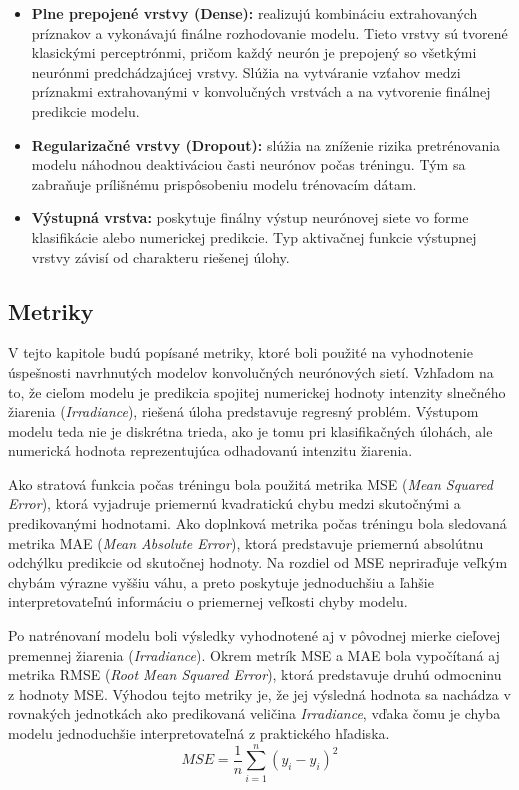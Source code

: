 \begin{itemize}
    \item \textbf{Plne prepojené vrstvy (Dense):} realizujú kombináciu extrahovaných príznakov a vykonávajú 
    finálne rozhodovanie modelu. Tieto vrstvy sú tvorené klasickými perceptrónmi, pričom každý 
    neurón je prepojený so všetkými neurónmi predchádzajúcej vrstvy. Slúžia na vytváranie vzťahov medzi 
    príznakmi extrahovanými v konvolučných vrstvách a na vytvorenie finálnej predikcie modelu.

    \item \textbf{Regularizačné vrstvy (Dropout):} slúžia na zníženie rizika pretrénovania modelu náhodnou deaktiváciou časti neurónov počas tréningu. Tým sa zabraňuje prílišnému prispôsobeniu modelu trénovacím dátam.

    \item \textbf{Výstupná vrstva:} poskytuje finálny výstup neurónovej siete vo forme klasifikácie alebo numerickej predikcie. Typ aktivačnej funkcie výstupnej vrstvy závisí od charakteru riešenej úlohy.
\end{itemize}





\vspace{\baselineskip}
\subsection{Metriky}
V tejto kapitole budú popísané metriky, ktoré boli použité na vyhodnotenie úspešnosti navrhnutých 
modelov konvolučných neurónových sietí. Vzhľadom na to, že cieľom modelu je predikcia spojitej numerickej hodnoty intenzity 
slnečného žiarenia (\textit{Irradiance}), riešená úloha predstavuje regresný problém. 
Výstupom modelu teda nie je diskrétna trieda, ako je tomu pri klasifikačných úlohách, ale numerická hodnota reprezentujúca 
odhadovanú intenzitu žiarenia.

Ako stratová funkcia počas tréningu bola 
použitá metrika MSE (\textit{Mean Squared Error}), ktorá vyjadruje priemernú kvadratickú chybu medzi 
skutočnými a predikovanými hodnotami. Ako doplnková metrika počas tréningu bola sledovaná metrika MAE 
(\textit{Mean Absolute Error}), ktorá predstavuje priemernú absolútnu odchýlku predikcie od skutočnej hodnoty.
Na rozdiel od MSE nepriraďuje veľkým chybám výrazne vyššiu váhu, a preto poskytuje jednoduchšiu a ľahšie 
interpretovateľnú informáciu o priemernej veľkosti chyby modelu.

Po natrénovaní modelu boli výsledky vyhodnotené aj v pôvodnej mierke cieľovej premennej žiarenia (\textit{Irradiance}). 
Okrem metrík MSE a MAE bola vypočítaná aj metrika RMSE (\textit{Root Mean Squared Error}), 
ktorá predstavuje druhú odmocninu z hodnoty MSE. Výhodou tejto metriky je, že jej výsledná hodnota sa 
nachádza v rovnakých jednotkách ako predikovaná veličina \textit{Irradiance}, vďaka čomu je chyba modelu 
jednoduchšie interpretovateľná z praktického hľadiska.
\begin{equation*}
MSE = \frac{1}{n}\sum_{i=1}^{n}(y_i - \hat{y}_i)^2
\end{equation*}

